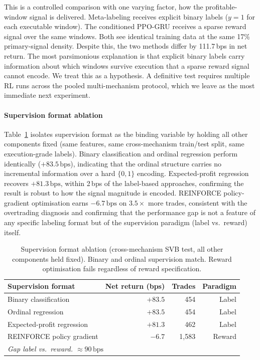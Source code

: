 \documentclass[sigconf,anonymous,natbib=false]{acmart}
\newcommand{\bps}{\,\text{bps}}
\begin{document}
This is a controlled comparison with one varying factor, how the
profitable-window signal is delivered.
Meta-labeling receives explicit binary labels ($y{=}1$ for each
executable window). The conditioned PPO-GRU receives a sparse reward
signal over the same windows.
Both see identical training data at the same 17\% primary-signal
density.
Despite this, the two methods differ by 111.7\,bps in net return.
The most parsimonious explanation is that explicit binary labels carry
information about which windows survive execution that a sparse reward
signal cannot encode.
We treat this as a hypothesis. A definitive test requires multiple
RL runs across the pooled multi-mechanism protocol, which we leave as
the most immediate next experiment.

\paragraph{Supervision format ablation}
Table~\ref{tab:supervision_format} isolates supervision format as the
binding variable by holding all other components fixed (same features,
same cross-mechanism train/test split, same execution-grade labels).
Binary classification and ordinal regression perform identically
($+83.5\bps$), indicating that the ordinal structure carries no
incremental information over a hard $\{0,1\}$ encoding.
Expected-profit regression recovers $+81.3\bps$, within 2\,bps of
the label-based approaches, confirming the result is robust to how the
signal magnitude is encoded.
REINFORCE policy-gradient optimisation earns $-6.7\bps$ on $3.5\times$
more trades, consistent with the overtrading diagnosis and confirming
that the performance gap is not a feature of any specific labeling
format but of the supervision paradigm (label vs.\ reward) itself.

\begin{table}[h]
\centering
\caption{Supervision format ablation (cross-mechanism SVB test, all other
  components held fixed). Binary and ordinal supervision match. Reward
  optimisation fails regardless of reward specification.}
\label{tab:supervision_format}
\setlength{\tabcolsep}{4pt}
{\small
\begin{tabular}{lrrr}
\toprule
\textbf{Supervision format} & \textbf{Net return (bps)} & \textbf{Trades} & \textbf{Paradigm} \\
\midrule
Binary classification       & $+83.5$ & 454   & Label \\
Ordinal regression          & $+83.5$ & 454   & Label \\
Expected-profit regression  & $+81.3$ & 462   & Label \\
REINFORCE policy gradient   & $-6.7$  & 1{,}583 & Reward \\
\midrule
\multicolumn{4}{l}{\textit{Gap label vs.\ reward. $\approx90\bps$}} \\
\bottomrule
\end{tabular}
}
\end{table}
\end{document}
